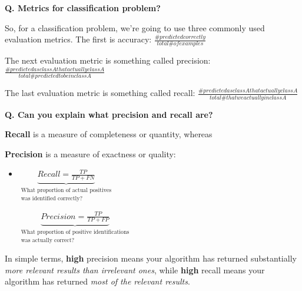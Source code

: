 
\begin{frame}[fragile]{\textbf{Q. Metrics for classification problem?}}
\begin{wideitemize}
  \item So, for a classification problem, we're going to use three commonly
  used evaluation metrics. The first is accuracy:
  $\frac{\# predicted correctly}{total \# of examples}$
  \item The next evaluation metric is something called precision:
  $\frac{\# predicted as class A that actually class A}{total \# predicted to be in class A}$
  \item The last evaluation metric is something called recall:
  $\frac{\# predicted as class A that actually class A}{total \# that we actually in class A}$
\end{wideitemize}
\end{frame}

\begin{frame}[fragile]{\textbf{Q. Can you explain what precision and recall are?}}
\begin{wideitemize}
  \item \textbf{Recall} is a measure of completeness or quantity, whereas
   \item \textbf{Precision} is a measure of exactness or quality:\vspace{.4em}
  \begin{itemize}
    \item \parbox[t]{1.5in}{$\underbrace{Recall = \frac{TP}{TP +
            FN}}_{\substack{\text{What proportion of actual positives}\\ \text{was identified correctly?}}}$} \hspace{.6in}
      \parbox[t]{1.5in}{$\underbrace{Precision = \frac{TP}{TP + FP}}_{\substack{\text{What
            proportion of positive identifications}\\\text{was actually correct?}}}$}
  \end{itemize}
  \item In simple terms, \textbf{high} precision means your algorithm has returned
  substantially \textit{more relevant results than irrelevant ones}, while
  \textbf{high} recall means your algorithm has returned \textit{most of the
  relevant results}.
\end{wideitemize}
\end{frame}

